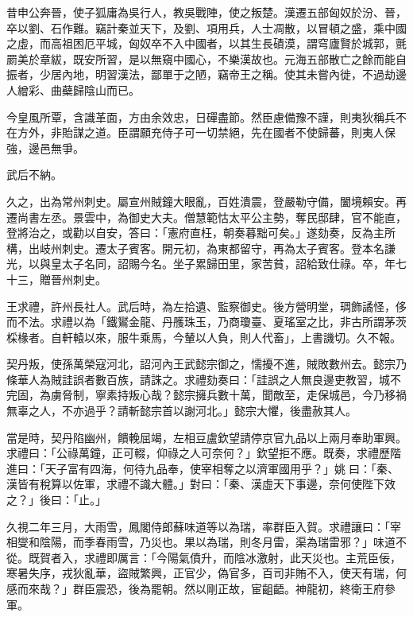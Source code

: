 \begin{pinyinscope}
 昔申公奔晉，使子狐庸為吳行人，教吳戰陣，使之叛楚。漢遷五部匈奴於汾、晉，卒以劉、石作難。竊計秦並天下，及劉、項用兵，人士凋散，以冒頓之盛，乘中國之虛，而高祖困厄平城，匈奴卒不入中國者，以其生長磧漠，謂穹廬賢於城郭，氈罽美於章紱，既安所習，是以無窺中國心，不樂漢故也。元海五部散亡之餘而能自振者，少居內地，明習漢法，鄙單于之陋，竊帝王之稱。使其未嘗內徙，不過劫邊人繒彩、曲蘗歸陰山而已。



 今皇風所覃，含識革面，方由余效忠，日磾盡節。然臣慮備豫不謹，則夷狄稱兵不在方外，非貽謀之道。臣謂願充侍子可一切禁絕，先在國者不使歸蕃，則夷人保強，邊邑無爭。



 武后不納。



 久之，出為常州刺史。屬宣州賊鐘大眼亂，百姓潰震，登嚴勒守備，闔境賴安。再遷尚書左丞。景雲中，為御史大夫。僧慧範怙太平公主勢，奪民邸肆，官不能直，登將治之，或勸以自安，答曰：「憲府直枉，朝奏暮黜可矣。」遂劾奏，反為主所構，出岐州刺史。遷太子賓客。開元初，為東都留守，再為太子賓客。登本名謙光，以與皇太子名同，詔賜今名。坐子累歸田里，家苦貧，詔給致仕祿。卒，年七十三，贈晉州刺史。



 王求禮，許州長社人。武后時，為左拾遺、監察御史。後方營明堂，琱飾譎怪，侈而不法。求禮以為「鐵鸑金龍、丹雘珠玉，乃商瓊臺、夏瑤室之比，非古所謂茅茨棌椽者。自軒轅以來，服牛乘馬，今輦以人負，則人代畜」，上書譏切。久不報。



 契丹叛，使孫萬榮寇河北，詔河內王武懿宗御之，懦擾不進，賊敗數州去。懿宗乃條華人為賊詿誤者數百族，請誅之。求禮劾奏曰：「詿誤之人無良邊吏教習，城不完固，為虜脅制，寧素持叛心哉？懿宗擁兵數十萬，聞敵至，走保城邑，今乃移禍無辜之人，不亦過乎？請斬懿宗首以謝河北。」懿宗大懼，後盡赦其人。



 當是時，契丹陷幽州，饋輓屈竭，左相豆盧欽望請停京官九品以上兩月奉助軍興。求禮曰：「公祿萬鐘，正可輟，仰祿之人可奈何？」欽望拒不應。既奏，求禮歷階進曰：「天子富有四海，何待九品奉，使宰相奪之以濟軍國用乎？」姚曰：「秦、漢皆有稅算以佐軍，求禮不識大體。」對曰：「秦、漢虛天下事邊，奈何使陛下效之？」後曰：「止。」



 久視二年三月，大雨雪，鳳閣侍郎蘇味道等以為瑞，率群臣入賀。求禮讓曰：「宰相燮和陰陽，而季春雨雪，乃災也。果以為瑞，則冬月雷，渠為瑞雷邪？」味道不從。既賀者入，求禮即厲言：「今陽氣僨升，而陰冰激射，此天災也。主荒臣佞，寒暑失序，戎狄亂華，盜賊繁興，正官少，偽官多，百司非賄不入，使天有瑞，何感而來哉？」群臣震恐，後為罷朝。然以剛正故，宦齟齬。神龍初，終衛王府參軍。




\end{pinyinscope}
